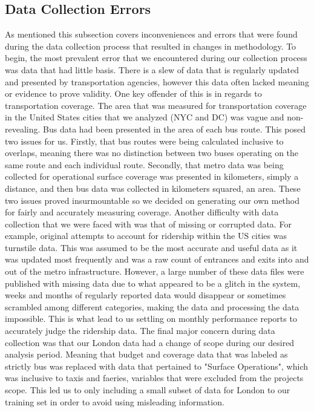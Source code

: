 \documentclass[12pt]{article}
\begin{document}
\begin{multicols}{2}
\subsection{Data Collection Errors}
As mentioned this subsection covers inconveniences and errors that were found during the data collection process that resulted in changes in methodology. To begin, the most prevalent error that we encountered during our collection process was data that had little basis. There is a slew of data that is regularly updated and presented by transportation agencies, however this data often lacked meaning or evidence to prove validity. One key offender of this is in regards to transportation coverage. The area that was measured for transportation coverage in the United States cities that we analyzed (NYC and DC) was vague and non-revealing. Bus data had been presented in the area of each bus route. This posed two issues for us. Firstly, that bus routes were being calculated inclusive to overlaps, meaning there was no distinction between two buses operating on the same route and each individual route. Secondly, that metro data was being collected for operational surface coverage was presented in kilometers, simply a distance, and then bus data was collected in kilometers squared, an area. These two issues proved insurmountable so we decided on generating our own method for fairly and accurately measuring coverage. Another difficulty with data collection that we were faced with was that of missing or corrupted data. For example, original attempts to account for ridership within the US cities was turnstile data. This was assumed to be the most accurate and useful data as it was updated most frequently and was a raw count of entrances and exits into and out of the metro infrastructure. However, a large number of these data files were published with missing data due to what appeared to be a glitch in the system, weeks and months of regularly reported data would disappear or sometimes scrambled among different categories, making the data and processing the data impossible. This is what lead to us settling on monthly performance reports to accurately judge the ridership data. The final major concern during data collection was that our London data had a change of scope during our desired analysis period. Meaning that budget and coverage data that was labeled as strictly bus was replaced with data that pertained to "Surface Operations", which was inclusive to taxis and faeries, variables that were excluded from the projects scope. This led us to only including a small subset of data for London to our training set in order to avoid using misleading information.


\end{multicols}
\end{document}
